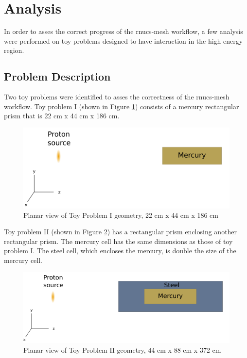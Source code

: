 \section{Analysis}\label{sc:analysis}
In order to asses the correct progress of the rnucs-mesh workflow, a few 
analysis were performed on toy problems designed to have interaction in the 
high energy region. 

\subsection{Problem Description}
Two toy problems were identified to asses the correctness of the 
rnucs-mesh workflow. 
Toy problem I (shown in Figure \ref{TPI}) consists of a mercury rectangular prism that is 
22 cm x 44 cm x 186 cm. 

\begin{figure}[h!]
\begin{centering}
\includegraphics[width=0.60\linewidth]{../figs/mercury.png}
\caption{Planar view of Toy Problem I geometry, 22 cm  x 44 cm x 186 cm }
\label{TPI}
\end{centering}
\end{figure}
Toy problem II (shown in Figure \ref{TPII}) has a rectangular prism enclosing another rectangular
prism. 
The mercury cell has the same dimensions as those of toy problem I. The steel 
cell, which encloses the mercury, is double the size of the mercury cell. 
\begin{figure}[h!]
\begin{centering}
\includegraphics[width=0.70\linewidth]{../figs/mer_steel.png}
\caption{Planar view of Toy Problem II geometry, 44 cm  x 88 cm x 372 cm }
\label{TPII}
\end{centering}
\end{figure}

